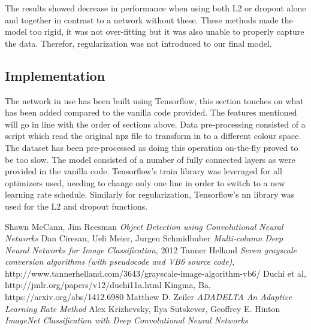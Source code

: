 \documentclass[12pt]{article}
\begin{document}
The results showed decrease in performance when using both L2 or dropout alone and together in contrast to a network without these. These methods made the model too rigid, it was not over-fitting but it was also unable to properly capture the data. Therefor, regularization was not introduced to our final model.

\subsection*{Implementation}

The network in use has been built using Tensorflow, this section touches on what has been added compared to the vanilla code provided. The features mentioned will go in line with the order of sections above. Data pre-processing consisted of a script which read the original npz file to transform in to a different colour space. The dataset has been pre-processed as doing this operation on-the-fly proved to be too slow.
The model consisted of a number of fully connected layers as were provided in the vanilla code. Tensorflow's train library was leveraged for all optimizers used, needing to change only one line in order to switch to a new learning rate schedule. Similarly for regularization, Tensorflow's nn library was used for the L2 and dropout functions.

\begin{thebibliography}{1}
 Shawn McCann, Jim Reesman {\em Object Detection using Convolutional Neural Networks} 
 Dan Ciresan, Ueli Meier, Jurgen Schmidhuber {\em Multi-column Deep Neural Networks for Image Classification}, 2012
 Tanner Helland {\em Seven grayscale conversion algorithms (with pseudocode and VB6 source code)}, http://www.tannerhelland.com/3643/grayscale-image-algorithm-vb6/
 Duchi et al, http://jmlr.org/papers/v12/duchi11a.html
 Kingma, Ba, https://arxiv.org/abs/1412.6980
 Matthew D. Zeiler {\em ADADELTA An Adaptive Learning Rate Method}
 Alex Krizhevsky, Ilya Sutskever, Geoffrey E. Hinton {\em ImageNet Classification with Deep Convolutional Neural Networks}


\end{thebibliography}
\end{document}
